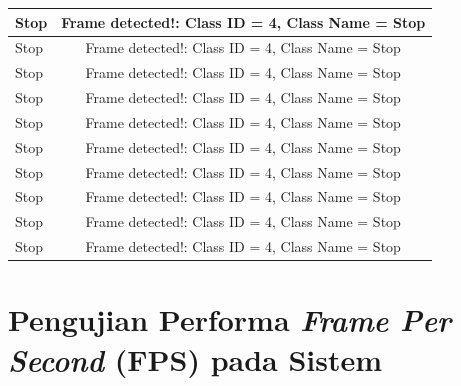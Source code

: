 \begin{longtable}{|l|c|}
  Stop           & Frame detected!: Class ID = 4, Class Name = Stop \\ \hline
  Stop           & Frame detected!: Class ID = 4, Class Name = Stop \\ \hline
  Stop           & Frame detected!: Class ID = 4, Class Name = Stop \\ \hline
  Stop           & Frame detected!: Class ID = 4, Class Name = Stop \\ \hline
  Stop           & Frame detected!: Class ID = 4, Class Name = Stop \\ \hline
  Stop           & Frame detected!: Class ID = 4, Class Name = Stop \\ \hline
  Stop           & Frame detected!: Class ID = 4, Class Name = Stop \\ \hline
  Stop           & Frame detected!: Class ID = 4, Class Name = Stop \\ \hline
  Stop           & Frame detected!: Class ID = 4, Class Name = Stop \\ \hline
  Stop           & Frame detected!: Class ID = 4, Class Name = Stop \\ \hline
\end{longtable}

\section{Pengujian Performa \emph{Frame Per Second} (FPS) pada Sistem}

